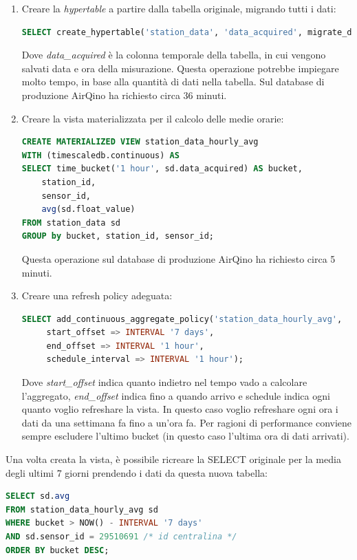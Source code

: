 \begin{enumerate}
  \item  Creare la \textit{hypertable} a partire dalla tabella originale, migrando tutti i dati:
\vspace{1mm}
\begin{lstlisting}[language=sql]
SELECT create_hypertable('station_data', 'data_acquired', migrate_data => true);
\end{lstlisting}
Dove \textit{data\_acquired} è la colonna temporale della tabella, in cui vengono salvati data e ora della misurazione.
Questa operazione potrebbe impiegare molto tempo, in base alla quantità di dati nella tabella. Sul database di produzione AirQino ha richiesto circa 36 minuti.
  \item Creare la vista materializzata per il calcolo delle medie orarie:
\vspace{1mm}
\begin{lstlisting}[language=sql]
CREATE MATERIALIZED VIEW station_data_hourly_avg
WITH (timescaledb.continuous) AS
SELECT time_bucket('1 hour', sd.data_acquired) AS bucket, 
    station_id,  
    sensor_id, 
    avg(sd.float_value) 
FROM station_data sd
GROUP by bucket, station_id, sensor_id;
\end{lstlisting}
Questa operazione sul database di produzione AirQino ha richiesto circa 5 minuti.
  \item Creare una refresh policy adeguata:
\vspace{1mm}
\begin{lstlisting}[language=sql]
SELECT add_continuous_aggregate_policy('station_data_hourly_avg',
     start_offset => INTERVAL '7 days',
     end_offset => INTERVAL '1 hour',
     schedule_interval => INTERVAL '1 hour');
\end{lstlisting}
Dove \textit{start\_offset} indica quanto indietro nel tempo vado a calcolare l'aggregato, \textit{end\_offset} indica fino a quando arrivo e schedule indica ogni quanto voglio refreshare la vista.
In questo caso voglio refreshare ogni ora i dati da una settimana fa fino a un'ora fa.
Per ragioni di performance conviene sempre escludere l'ultimo bucket (in questo caso l'ultima ora di dati arrivati).
\end{enumerate}

Una volta creata la vista, è possibile ricreare la SELECT originale per la media degli ultimi 7 giorni prendendo i dati da questa nuova tabella:
\vspace{1mm}
\begin{lstlisting}[language=sql]
SELECT sd.avg
FROM station_data_hourly_avg sd
WHERE bucket > NOW() - INTERVAL '7 days'
AND sd.sensor_id = 29510691 /* id centralina */
ORDER BY bucket DESC;
\end{lstlisting}


